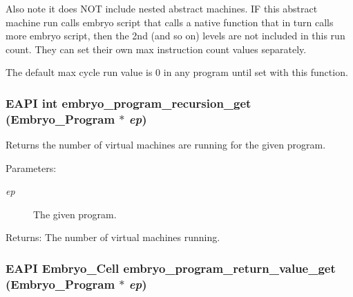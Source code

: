 Also note it does NOT include nested abstract machines. IF this abstract machine run calls embryo script that calls a native function that in turn calls more embryo script, then the 2nd (and so on) levels are not included in this run count. They can set their own max instruction count values separately.

The default max cycle run value is 0 in any program until set with this function. \hypertarget{group__Embryo__Run__Group_g4497fa4413a00d7f482772cdc6f7309d}{
\subsubsection{\setlength{\rightskip}{0pt plus 5cm}EAPI int embryo\_\-program\_\-recursion\_\-get (Embryo\_\-Program $\ast$ {\em ep})}}
\label{group__Embryo__Run__Group_g4497fa4413a00d7f482772cdc6f7309d}


Returns the number of virtual machines are running for the given program. 

\begin{Desc}
\item[Parameters:]
\begin{description}
\item[{\em ep}]The given program. \end{description}
\end{Desc}
\begin{Desc}
\item[Returns:]The number of virtual machines running. \end{Desc}
\hypertarget{group__Embryo__Run__Group_g91a7c05bafd22e94d776a117a297201d}{
\subsubsection{\setlength{\rightskip}{0pt plus 5cm}EAPI Embryo\_\-Cell embryo\_\-program\_\-return\_\-value\_\-get (Embryo\_\-Program $\ast$ {\em ep})}}
\label{group__Embryo__Run__Group_g91a7c05bafd22e94d776a117a297201d}



